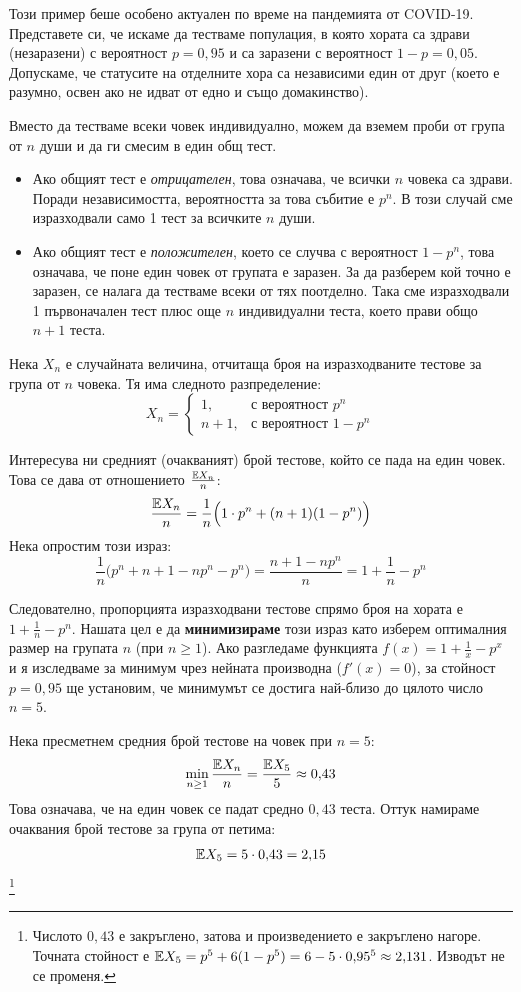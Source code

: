 Този пример беше особено актуален по време на пандемията от COVID-19. Представете си, че искаме да тестваме популация, в която хората са здрави (незаразени) с вероятност $p = 0{,}95$ и са заразени с вероятност $1-p = 0{,}05$. Допускаме, че статусите на отделните хора са независими един от друг (което е разумно, освен ако не идват от едно и също домакинство).

Вместо да тестваме всеки човек индивидуално, можем да вземем проби от група от $n$ души и да ги смесим в един общ тест.
\begin{itemize}
    \item Ако общият тест е \emph{отрицателен}, това означава, че всички $n$ човека са здрави. Поради независимостта, вероятността за това събитие е $p^n$. В този случай сме изразходвали само 1 тест за всичките $n$ души.
    \item Ако общият тест е \emph{положителен}, което се случва с вероятност $1 - p^n$, това означава, че поне един човек от групата е заразен. За да разберем кой точно е заразен, се налага да тестваме всеки от тях поотделно. Така сме изразходвали 1 първоначален тест плюс още $n$ индивидуални теста, което прави общо $n+1$ теста.
\end{itemize}

Нека $X_n$ е случайната величина, отчитаща броя на изразходваните тестове за група от $n$ човека. Тя има следното разпределение:
\[
X_n =
\begin{cases}
1, & \text{с вероятност } p^n \\
n+1, & \text{с вероятност } 1-p^n
\end{cases}
\]

Интересува ни средният (очакваният) брой тестове, който се пада на един човек. Това се дава от отношението $\frac{\mathbb{E} X_n}{n}$:
\[ \frac{\mathbb{E} X_n}{n} = \frac{1}{n} \Big( 1 \cdot p^n + (n+1)(1-p^n) \Big) \]
Нека опростим този израз:
\[ \frac{1}{n} \Big( p^n + n + 1 - np^n - p^n \Big) = \frac{n + 1 - np^n}{n} = 1 + \frac{1}{n} - p^n \]

Следователно, пропорцията изразходвани тестове спрямо броя на хората е $1 + \frac{1}{n} - p^n$. Нашата цел е да \textbf{минимизираме} този израз като изберем оптималния размер на групата $n$ (при $n \ge 1$).
Ако разгледаме функцията $f(x) = 1 + \frac{1}{x} - p^x$ и я изследваме за минимум чрез нейната производна ($f'(x) = 0$), за стойност $p = 0{,}95$ ще установим, че минимумът се достига най-близо до цялото число $n = 5$.

Нека пресметнем средния брой тестове на човек при $n = 5$:
\[ \min_{n \ge 1} \frac{\mathbb{E} X_n}{n} = \frac{\mathbb{E} X_5}{5} \approx 0{,}43 \]
Това означава, че на един човек се падат средно $0{,}43$ теста. Оттук намираме очаквания брой тестове за група от петима:
\[ \mathbb{E} X_5 = 5 \cdot 0{,}43 = 2{,}15 \]\footnote{Числото $0{,}43$ е закръглено, затова и произведението е закръглено нагоре. Точната стойност е $\mathbb{E} X_5 = p^5 + 6(1-p^5) = 6 - 5 \cdot 0{,}95^5 \approx 2{,}131$. Изводът не се променя.}

